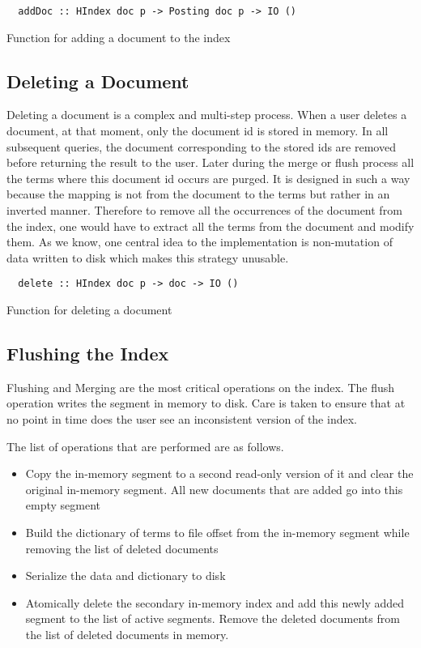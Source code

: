 \begin{listing}
\begin{verbatim}
  addDoc :: HIndex doc p -> Posting doc p -> IO ()
\end{verbatim}
\caption{Function for adding a document to the index}
\end{listing}

\subsection{Deleting a Document}
Deleting a document is a complex and multi-step process. When a user deletes a document, at that moment, only the document id is stored in memory.
In all subsequent queries, the document corresponding to the stored ids are removed before returning the result to the user.
Later during the merge or flush process all the terms where this document id occurs are purged.
It is designed in such a way because the mapping is not from the document to the terms but rather in an inverted manner.
Therefore to remove all the occurrences of the document from the index, one would have to extract all the terms from the document and modify them.
As we know, one central idea to the implementation is non-mutation of data written to disk which makes this strategy unusable.

\begin{listing}
\begin{verbatim}
  delete :: HIndex doc p -> doc -> IO ()
\end{verbatim}
\caption{Function for deleting a document}
\end{listing}

\subsection{Flushing the Index}
Flushing and Merging are the most critical operations on the index.
The flush operation writes the segment in memory to disk. Care is taken to ensure that at no point in time does the user see an inconsistent version of the index.

The list of operations that are performed are as follows.
\begin{itemize}
\item Copy the in-memory segment to a second read-only version of it and clear the original in-memory segment.
All new documents that are added go into this empty segment
\item Build the dictionary of terms to file offset from the in-memory segment while removing the list of deleted documents
\item Serialize the data and dictionary to disk
\item Atomically delete the secondary in-memory index and add this newly added segment to the list of active segments.
Remove the deleted documents from the list of deleted documents in memory.
\end{itemize}

